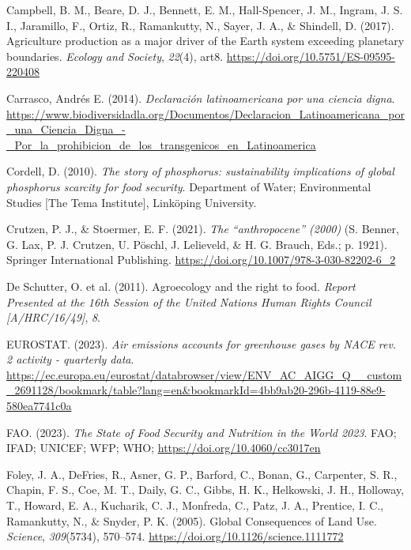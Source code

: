 \documentclass[a4paper, nobind]{templates/ociamthesis}
\newlength{\cslhangindent}
\newenvironment{CSLReferences}[2] %
 {%
  \setlength{\parindent}{0pt}
  \ifodd #1
  \let\oldpar\par
  \def\par{\hangindent=\cslhangindent\oldpar}
  \fi
  \setlength{\parskip}{1mm}
  \setlength{\baselineskip}{6mm}
 }%
 {}
\begin{document}
\begin{CSLReferences}{1}{0}
\leavevmode{}%
Campbell, B. M., Beare, D. J., Bennett, E. M., Hall-Spencer, J. M., Ingram, J. S. I., Jaramillo, F., Ortiz, R., Ramankutty, N., Sayer, J. A., \& Shindell, D. (2017). Agriculture production as a major driver of the Earth system exceeding planetary boundaries. \emph{Ecology and Society}, \emph{22}(4), art8. \url{https://doi.org/10.5751/ES-09595-220408}

\leavevmode{}%
Carrasco, Andrés E. (2014). \emph{Declaración latinoamericana por una ciencia digna}. \url{https://www.biodiversidadla.org/Documentos/Declaracion_Latinoamericana_por_una_Ciencia_Digna_-_Por_la_prohibicion_de_los_transgenicos_en_Latinoamerica}

\leavevmode{}%
Cordell, D. (2010). \emph{The story of phosphorus: sustainability implications of global phosphorus scarcity for food security}. Department of Water; Environmental Studies {[}The Tema Institute{]}, Linköping University.

\leavevmode{}%
Crutzen, P. J., \& Stoermer, E. F. (2021). \emph{The {``anthropocene''} (2000)} (S. Benner, G. Lax, P. J. Crutzen, U. Pöschl, J. Lelieveld, \& H. G. Brauch, Eds.; p. 1921). Springer International Publishing. \url{https://doi.org/10.1007/978-3-030-82202-6_2}

\leavevmode{}%
De Schutter, O. et al. (2011). Agroecology and the right to food. \emph{Report Presented at the 16th Session of the United Nations Human Rights Council {[}A/HRC/16/49{]}}, \emph{8}.

\leavevmode{}%
EUROSTAT. (2023). \emph{Air emissions accounts for greenhouse gases by NACE rev. 2 activity - quarterly data}. \url{https://ec.europa.eu/eurostat/databrowser/view/ENV_AC_AIGG_Q__custom_2691128/bookmark/table?lang=en&bookmarkId=4bb9ab20-296b-4119-88e9-580ea7741c0a}

\leavevmode{}%
FAO. (2023). \emph{The State of Food Security and Nutrition in the World 2023}. FAO; IFAD; UNICEF; WFP; WHO; \url{https://doi.org/10.4060/cc3017en}

\leavevmode{}%
Foley, J. A., DeFries, R., Asner, G. P., Barford, C., Bonan, G., Carpenter, S. R., Chapin, F. S., Coe, M. T., Daily, G. C., Gibbs, H. K., Helkowski, J. H., Holloway, T., Howard, E. A., Kucharik, C. J., Monfreda, C., Patz, J. A., Prentice, I. C., Ramankutty, N., \& Snyder, P. K. (2005). Global Consequences of Land Use. \emph{Science}, \emph{309}(5734), 570--574. \url{https://doi.org/10.1126/science.1111772}


\end{CSLReferences}
\end{document}
